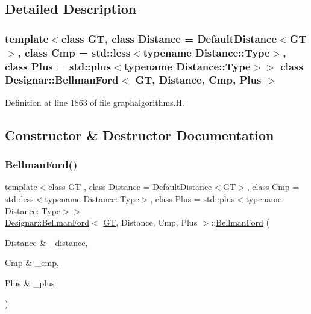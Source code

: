 \subsection{Detailed Description}
\subsubsection*{template$<$class GT, class Distance = Default\+Distance$<$\+G\+T$>$, class Cmp = std\+::less$<$typename Distance\+::\+Type$>$, class Plus = std\+::plus$<$typename Distance\+::\+Type$>$$>$\newline
class Designar\+::\+Bellman\+Ford$<$ G\+T, Distance, Cmp, Plus $>$}



Definition at line 1863 of file graphalgorithms.\+H.



\subsection{Constructor \& Destructor Documentation}
\mbox{\label{class_designar_1_1_bellman_ford_adb2ea922dfd109d977cb85a5a10873ae}} 
\subsubsection{\texorpdfstring{Bellman\+Ford()}{BellmanFord()}\hspace{0.1cm}{\footnotesize\ttfamily [1/2]}}
{\footnotesize\ttfamily template$<$class GT , class Distance  = Default\+Distance$<$\+G\+T$>$, class Cmp  = std\+::less$<$typename Distance\+::\+Type$>$, class Plus  = std\+::plus$<$typename Distance\+::\+Type$>$$>$ \\
\hyperlink{class_designar_1_1_bellman_ford}{Designar\+::\+Bellman\+Ford}$<$ \hyperlink{demo-buildgraph_8_c_a3001c40d2c31ca87ed96cd7d1334a55e}{GT}, Distance, Cmp, Plus $>$\+::\hyperlink{class_designar_1_1_bellman_ford}{Bellman\+Ford} (\begin{DoxyParamCaption}\item[{Distance \&}]{\+\_\+distance,  }\item[{Cmp \&}]{\+\_\+cmp,  }\item[{Plus \&}]{\+\_\+plus }\end{DoxyParamCaption})\hspace{0.3cm}{\ttfamily [inline]}}




